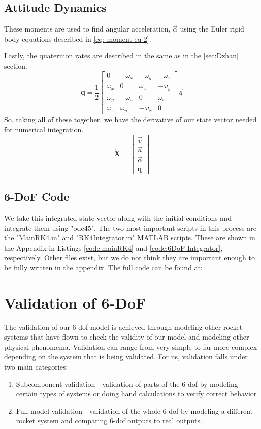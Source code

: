\documentclass[12pt]{report}
\begin{document}
{\subsection{Attitude Dynamics}
These moments are used to find angular acceleration, $\vec{\alpha}$ using the Euler rigid body equations described in \eqref{eq: moment eq 2}. 

Lastly, the quaternion rates are described in the same as in the \ref{sec:Dzhan} section.
\begin{equation}
    \dot{\textbf{q}}=\frac{1}{2}\begin{bmatrix}
        0&-\omega_x&-\omega_y&-\omega_z\\
        \omega_x&0&\omega_z&-\omega_y\\
        \omega_y&-\omega_z&0&\omega_x\\
        \omega_z&\omega_y&-\omega_x&0
    \end{bmatrix}\vec{q}
\end{equation}
So, taking all of these together, we have the derivative of our \gls{state vector} needed for numerical integration.
\begin{equation}
    \dot{\textbf{X}}=\begin{bmatrix}
        \vec{v}\\\vec{a}\\\vec{\alpha}\\\dot{\textbf{q}}
    \end{bmatrix}
\end{equation}
\subsection{6-DoF Code}
We take this integrated state vector along with the initial conditions and integrate them using "ode45". The two most important scripts in this process are the "MainRK4.m" and "RK4Integrator.m" MATLAB scripts. These are shown in the Appendix in Listings \ref{code:mainRK4} and  \ref{code:6DoF Integrator}, respectively. Other files exist, but we do not think they are important enough to be fully written in the appendix. The full code can be found at: %
\section{Validation of 6-DoF}
The validation of our 6-\gls{dof} model is achieved through modeling other rocket systems that have flown to check the validity of our model and modeling other physical phenomema. Validation can range from very simple to far more complex depending on the system that is being validated. For us, validation falls under two main categories:
\begin{enumerate}
    \item Subcomponent validation - validation of parts of the 6-\gls{dof} by modeling certain types of systems or doing hand calculations to verify correct behavior
    \item Full model validation - validation of the whole 6-\gls{dof} by modeling a different rocket system and comparing 6-\gls{dof} outputs to real outputs.
\end{enumerate}


}
\end{document}
